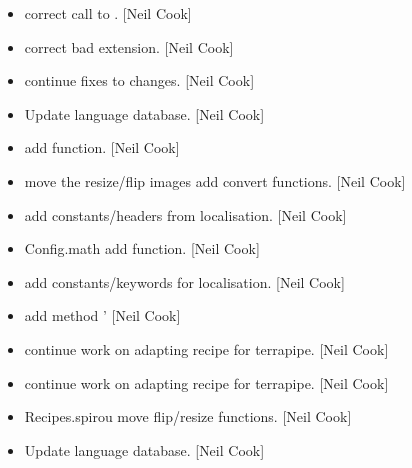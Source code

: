 \documentclass[a4paper,10pt,english]{report}
\begin{document}
\begin{itemize}
\item {} 
 \sphinxhyphen{} correct call to . {[}Neil Cook{]}

\item {} 
 \sphinxhyphen{} correct bad extension. {[}Neil Cook{]}

\item {} 
 \sphinxhyphen{} continue fixes to  changes. {[}Neil Cook{]}

\item {} 
Update language database. {[}Neil Cook{]}

\item {} 
 \sphinxhyphen{} add  function. {[}Neil Cook{]}

\item {} 
 \sphinxhyphen{} move the resize/flip images add convert functions. {[}Neil
Cook{]}

\item {} 
 \sphinxhyphen{} add constants/headers from localisation.
{[}Neil Cook{]}

\item {} 
Config.math \sphinxhyphen{} add  function. {[}Neil Cook{]}

\item {} 
 \sphinxhyphen{} add constants/keywords for localisation.
{[}Neil Cook{]}

\item {} 
 \sphinxhyphen{} add method ’ {[}Neil Cook{]}

\item {} 
 \sphinxhyphen{} continue work on adapting recipe for terrapipe.
{[}Neil Cook{]}

\item {} 
 \sphinxhyphen{} continue work on adapting recipe for terrapipe.
{[}Neil Cook{]}

\item {} 
Recipes.spirou \sphinxhyphen{} move flip/resize functions. {[}Neil Cook{]}

\item {} 
Update language database. {[}Neil Cook{]}


\end{itemize}
\end{document}
